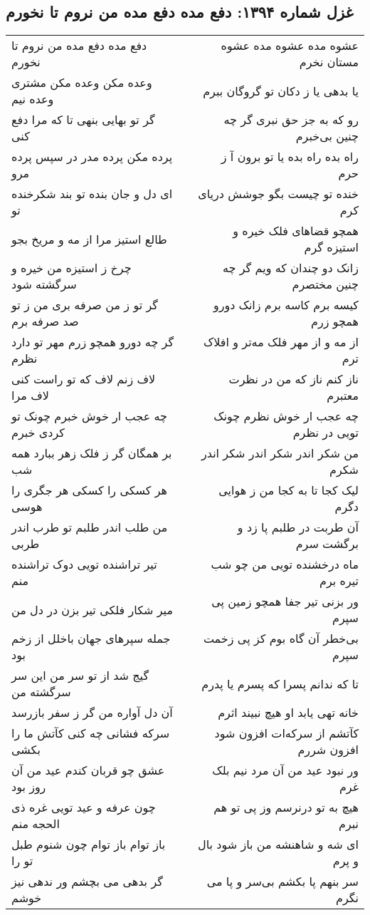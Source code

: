 \begin{center}
\section*{غزل شماره ۱۳۹۴: دفع مده دفع مده من نروم تا نخورم}
\label{sec:1394}
\begin{longtable}{l p{0.5cm} r}
دفع مده دفع مده من نروم تا نخورم
&&
عشوه مده عشوه مده عشوه مستان نخرم
\\
وعده مکن وعده مکن مشتری وعده نیم
&&
یا بدهی یا ز دکان تو گروگان ببرم
\\
گر تو بهایی بنهی تا که مرا دفع کنی
&&
رو که به جز حق نبری گر چه چنین بی‌خبرم
\\
پرده مکن پرده مدر در سپس پرده مرو
&&
راه بده راه بده یا تو برون آ ز حرم
\\
ای دل و جان بنده تو بند شکرخنده تو
&&
خنده تو چیست بگو جوشش دریای کرم
\\
طالع استیز مرا از مه و مریخ بجو
&&
همچو قضاهای فلک خیره و استیزه گرم
\\
چرخ ز استیزه من خیره و سرگشته شود
&&
زانک دو چندان که ویم گر چه چنین مختصرم
\\
گر تو ز من صرفه بری من ز تو صد صرفه برم
&&
کیسه برم کاسه برم زانک دورو همچو زرم
\\
گر چه دورو همچو زرم مهر تو دارد نظرم
&&
از مه و از مهر فلک مه‌تر و افلاک ترم
\\
لاف زنم لاف که تو راست کنی لاف مرا
&&
ناز کنم ناز که من در نظرت معتبرم
\\
چه عجب ار خوش خبرم چونک تو کردی خبرم
&&
چه عجب ار خوش نظرم چونک تویی در نظرم
\\
بر همگان گر ز فلک زهر ببارد همه شب
&&
من شکر اندر شکر اندر شکر اندر شکرم
\\
هر کسکی را کسکی هر جگری را هوسی
&&
لیک کجا تا به کجا من ز هوایی دگرم
\\
من طلب اندر طلبم تو طرب اندر طربی
&&
آن طربت در طلبم پا زد و برگشت سرم
\\
تیر تراشنده تویی دوک تراشنده منم
&&
ماه درخشنده تویی من چو شب تیره برم
\\
میر شکار فلکی تیر بزن در دل من
&&
ور بزنی تیر جفا همچو زمین پی سپرم
\\
جمله سپرهای جهان باخلل از زخم بود
&&
بی‌خطر آن گاه بوم کز پی زخمت سپرم
\\
گیج شد از تو سر من این سر سرگشته من
&&
تا که ندانم پسرا که پسرم یا پدرم
\\
آن دل آواره من گر ز سفر بازرسد
&&
خانه تهی یابد او هیچ نبیند اثرم
\\
سرکه فشانی چه کنی کآتش ما را بکشی
&&
کآتشم از سرکه‌ات افزون شود افزون شررم
\\
عشق چو قربان کندم عید من آن روز بود
&&
ور نبود عید من آن مرد نیم بلک غرم
\\
چون عرفه و عید تویی غره ذی الحجه منم
&&
هیچ به تو درنرسم وز پی تو هم نبرم
\\
باز توام باز توام چون شنوم طبل تو را
&&
ای شه و شاهنشه من باز شود بال و پرم
\\
گر بدهی می بچشم ور ندهی نیز خوشم
&&
سر بنهم پا بکشم بی‌سر و پا می نگرم
\\
\end{longtable}
\end{center}

